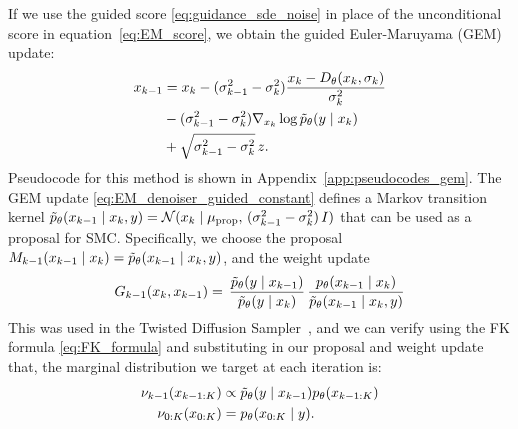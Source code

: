 If we use the guided score \eqref{eq:guidance_sde_noise} in place of the unconditional score in equation~\eqref{eq:EM_score}, we obtain the guided Euler-Maruyama (GEM) update:
\begin{align}
    x_{k-1} &= x_{k} -(\sigma_{k-1}^2 - \sigma_{k}^2)\frac{x_{k} - D_{\theta}(x_{k}, \sigma_{k})}{\sigma_{k}^2} 
     \nonumber \\
    &- (\sigma_{k-1}^2 - \sigma_{k}^2) \nabla_{x_{k}} \log \Tilde{p}_\theta(y \mid x_k) \nonumber \\
    &+ \sqrt{\sigma_{k-1}^2 - \sigma_{k}^2} \, z.
    \label{eq:EM_denoiser_guided_constant}
\end{align}
Pseudocode for this method is shown in Appendix~\ref{app:pseudocodes_gem}. 
The GEM update \eqref{eq:EM_denoiser_guided_constant} defines a Markov transition kernel $\Tilde{p}_{\theta}(x_{k-1} \mid x_{k}, y) = \mathcal{N}(x_k \mid \mu_{\text{prop}}, \, (\sigma_{k-1}^2 - \sigma_{k}^2) \,  I)$ that can be used as a proposal for SMC. 
Specifically, we choose the proposal $M_{k-1}(x_{k-1} \mid x_{k}) = \Tilde{p}_{\theta}(x_{k-1} \mid x_{k}, y)$, and the weight update 
%
\begin{align}
    G_{k-1}(x_{k}, x_{k-1}) =  \,
    \frac{\Tilde{p}_{\theta}(y \mid x_{k-1})}{\Tilde{p}_{\theta}(y \mid x_{k})} \,
    \frac{p_\theta(x_{k-1} \mid x_{k})}{\Tilde{p}_{\theta}(x_{k-1} \mid x_{k}, y)}
    \label{eq:weight_update_full} 
\end{align}
%
This was used in the Twisted Diffusion Sampler~\citep[TDS,][]{wu2023-TDS}, and we can verify using the FK formula \eqref{eq:FK_formula} and substituting in our proposal and weight update that, the marginal distribution we target at each iteration is: 
\begin{align}
    \nu_{k-1}(x_{k-1:K}) &\propto \Tilde{p}_{\theta}(y \mid x_{k-1}) p_\theta(x_{k-1:K}) \nonumber \\
    \nu_{0:K}(x_{0:K}) &= p_\theta(x_{0:K} \mid y).
    \label{eq:FK_target_normal}
\end{align}

